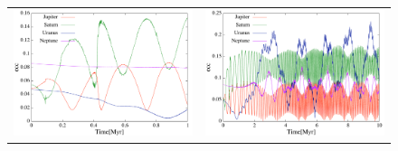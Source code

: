 \documentclass[11pt,a4paper,oneside,onecolumn]{jarticle}
\begin{document}
\begin{figure}[H]
\begin{tabular}{cc}
\begin{minipage}[t]{0.45\hsize}
\centering
\includegraphics[width=7.6cm]{./image/move5Myr_ecc_1Myr.pdf}
\end{minipage} &
\begin{minipage}[t]{0.45\hsize}
\centering
\includegraphics[width=7.6cm]{./image/move5Myr_ecc_10Myr.pdf}
\end{minipage}
%
\end{tabular}
\caption{\label{}}
\end{figure}
\end{document}
